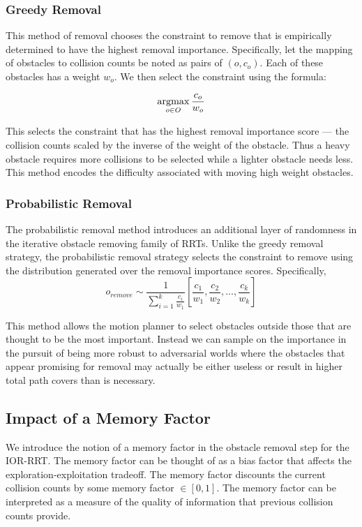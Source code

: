 \subsubsection{Greedy Removal}
This method of removal chooses the constraint to remove that is empirically determined to have the highest removal importance. Specifically, let the mapping of obstacles to collision counts be noted as pairs of $(o, c_o)$. Each of these obstacles has a weight $w_o$. We then select the constraint using the formula:

$$\operatorname*{argmax}\limits_{o \in O} \frac{c_o}{w_o}$$

This selects the constraint that has the highest removal importance score --- the collision counts scaled by the inverse of the weight of the obstacle. Thus a heavy obstacle requires more collisions to be selected while a lighter obstacle needs less. This method encodes the difficulty associated with moving high weight obstacles.

\subsubsection{Probabilistic Removal}
The probabilistic removal method introduces an additional layer of randomness in the iterative obstacle removing family of RRTs. Unlike the greedy removal strategy, the probabilistic removal strategy selects the constraint to remove using the distribution generated over the removal importance scores. Specifically,
$$o_{remove} \sim \frac{1}{\sum_{i=1}^k \frac{c_i}{w_1}}[\frac{c_1}{w_1}, \frac{c_2}{w_2},\ldots, \frac{c_k}{w_k}]$$

This method allows the motion planner to select obstacles outside those that are thought to be the most important. Instead we can sample on the importance in the pursuit of being more robust to adversarial worlds where the obstacles that appear promising for removal may actually be either useless or result in higher total path covers than is necessary. 


\subsection{Impact of a Memory Factor}
We introduce the notion of a memory factor in the obstacle removal step for the IOR-RRT. The memory factor can be thought of as a bias factor that affects the exploration-exploitation tradeoff. The memory factor discounts the current collision counts by some memory factor $\in [0,1]$. The memory factor can be interpreted as a measure of the quality of information that previous collision counts provide.

